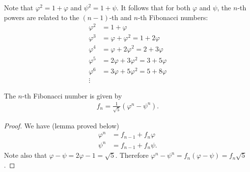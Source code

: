 Note that $\varphi^2 = 1 + \varphi$ and $\psi^2 = 1 + \psi$. It follows that for both $\varphi$ and
$\psi$, the $n$-th powers are related to the $(n-1)$-th and $n$-th Fibonacci numbers:
  \begin{align*}
    \varphi^2  &= 1 + \varphi \\
    \varphi^3  &= \varphi + \varphi^2 = 1 + 2\varphi \\
    \varphi^4 &= \varphi + 2\varphi^2 = 2 + 3\varphi \\
    \varphi^5 &= 2\varphi + 3\varphi^2 = 3 + 5\varphi \\
    \varphi^6 &= 3\varphi + 5\varphi^2 = 5 + 8\varphi \\
    \vdots
  \end{align*}

\begin{claim}
  The $n$-th Fibonacci number is given by
  \begin{align*}
    f_n = \frac{1}{\sqrt5}(\varphi^n - \psi^n).
  \end{align*}
\end{claim}

\begin{proof}
  We have (lemma proved below)
\begin{align*}
  \varphi^n &= f_{n-1} + f_n\varphi \\
  \psi^n &= f_{n-1} + f_n\psi.
\end{align*}
  Note also that $\varphi - \psi = 2\varphi - 1 = \sqrt 5$. Therefore $\varphi^n - \psi^n = f_n(\varphi - \psi) = f_n\sqrt5$.
\end{proof}

